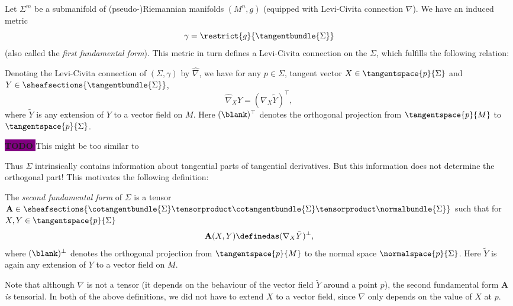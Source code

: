 \documentclass[titlepage,numbers=noenddot,headinclude,oneside,%
footinclude=true,cleardoublepage=empty,%
BCOR=5mm,paper=a4,fontsize=11pt,%
english,%
]{scrartcl}
\newcommand{\todomark}{%
    \colorbox{purple}{%
        \textnormal\ttfamily\bfseries\color{white}%
        TODO%
    }%
}
\newcommand{\todo}[1][]{%
    \ifstrempty{#1}{%
        \def\todotext{Todo}%
    }{%
        \def\todotext{Todo: #1}%
    }%
    \todomark%
    {%
        \marginpar{%
            \raggedright\normalfont\sffamily\scriptsize\todotext%
        }%
    }%
}
\begin{document}
{ \newcommand{\Mconnection}{\nabla}\newcommand{\Sigmaconnection}{\hat{\nabla}}
Let \( \Sigma^m \) be a submanifold of (pseudo-)Riemannian manifolds \( (M^n,g) \) (equipped with Levi-Civita connection \( \Mconnection \)). We have an induced metric
\begin{equation}
    \gamma=\restrict{g}{\tangentbundle{\Sigma}}\label{eq:first_fundamental_form}
\end{equation} (also called the \emph{first fundamental form}). This metric in turn defines a Levi-Civita connection on the \( \Sigma \), which fulfills the following relation:
\begin{fact}
  Denoting the Levi-Civita connection of \( (\Sigma,\gamma) \) by \( \Sigmaconnection \), we have for any \( p\in \Sigma \), tangent vector \( X\in \tangentspace{p}{\Sigma} \) and \( Y\in \sheafsections{\tangentbundle{\Sigma}} \),
  \begin{equation*}
    \Sigmaconnection_X Y=(\Mconnection_X \tilde{Y})^\top,
  \end{equation*}
  where \( \tilde{Y} \) is any extension of \( Y \) to a vector field on \( M \). Here \( (\blank)^\top \) denotes the orthogonal projection from \( \tangentspace{p}{M} \) to \( \tangentspace{p}{\Sigma} \).

  \todo{This might be too similar to \cite[2.1]{leeGeometricRelativity2019}}
\end{fact}
Thus \( \Sigma \) intrinsically contains information about tangential parts of tangential derivatives. But this information does not determine the orthogonal part! This motivates the following definition:
\begin{definition}
    The \emph{second fundamental form} of \( \Sigma \) is a tensor \( \mathbf{A}\in \sheafsections{\cotangentbundle{\Sigma}\tensorproduct \cotangentbundle{\Sigma}\tensorproduct \normalbundle{\Sigma}} \) such that for \( X,Y\in \tangentspace{p}{\Sigma} \)
    \begin{equation*}
        \mathbf{A}(X,Y)\definedas (\Mconnection_X \tilde{Y})^\perp,
    \end{equation*}
    where \( (\blank)^\perp \) denotes the orthogonal projection from \( \tangentspace{p}{M} \) to the normal space \( \normalspace{p}{\Sigma} \). Here \( \tilde{Y} \) is again any extension of \( Y \) to a vector field on \( M \).
\end{definition}  
Note that although \( \Mconnection \) is not a tensor (\ie it depends on the behaviour of the vector field \( \tilde{Y} \) around a point \( p \)), the second fundamental form \( \mathbf{A} \) \emph{is} tensorial. In both of the above definitions, we did not have to extend \( X \) to a vector field, since \( \Mconnection \) only depends on the value of \( X \) at \( p \).

}
\end{document}
